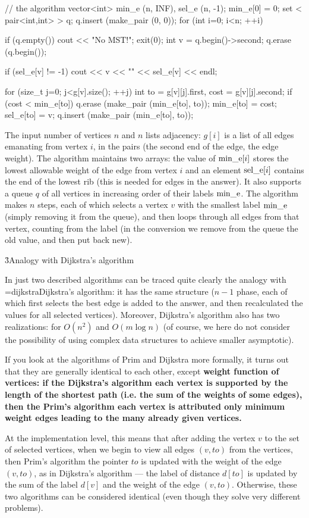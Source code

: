 // the algorithm
vector<int> min_e (n, INF), sel_e (n, -1);
min_e[0] = 0;
set < pair<int,int> > q;
q.insert (make_pair (0, 0));
for (int i=0; i<n; ++i) {
if (q.empty()) {
cout << "No MST!";
exit(0);
}
int v = q.begin()->second;
q.erase (q.begin());

if (sel_e[v] != -1)
cout << v << "" << sel_e[v] << endl;

for (size_t j=0; j<g[v].size(); ++j) {
int to = g[v][j].first,
cost = g[v][j].second;
if (cost < min_e[to]) {
q.erase (make_pair (min_e[to], to));
min_e[to] = cost;
sel_e[to] = v;
q.insert (make_pair (min_e[to], to));
}
}
}
\endcode

The input number of vertices $n$ and $n$ lists adjacency: $g[i]$ is a list of all edges emanating from vertex $i$, in the pairs (the second end of the edge, the edge weight). The algorithm maintains two arrays: the value of ${\rm min\_e}[i]$ stores the lowest allowable weight of the edge from vertex $i$ and an element ${\rm sel\_e}[i]$ contains the end of the lowest rib (this is needed for edges in the answer). It also supports a queue $q$ of all vertices in increasing order of their labels ${\rm min\_e}$. The algorithm makes $n$ steps, each of which selects a vertex $v$ with the smallest label ${\rm min\_e}$ (simply removing it from the queue), and then loops through all edges from that vertex, counting from the label (in the conversion we remove from the queue the old value, and then put back new).


\h3{Analogy with Dijkstra's algorithm}

In just two described algorithms can be traced quite clearly the analogy with \algohref=dijkstra{Dijkstra's algorithm}: it has the same structure ($n-1$ phase, each of which first selects the best edge is added to the answer, and then recalculated the values for all selected vertices). Moreover, Dijkstra's algorithm also has two realizations: for $O(n^2)$ and $O(m \log n)$ (of course, we here do not consider the possibility of using complex data structures to achieve smaller asymptotic).

If you look at the algorithms of Prim and Dijkstra more formally, it turns out that they are generally identical to each other, except \bf{weight function} of vertices: if the Dijkstra's algorithm each vertex is supported by the length of the shortest path (i.e. the sum of the weights of some edges), then the Prim's algorithm each vertex is attributed only minimum weight edges leading to the many already given vertices.

At the implementation level, this means that after adding the vertex $v$ to the set of selected vertices, when we begin to view all edges $(v,to)$ from the vertices, then Prim's algorithm the pointer $to$ is updated with the weight of the edge $(v,to)$, as in Dijkstra's algorithm --- the label of distance $d[to]$ is updated by the sum of the label $d[v]$ and the weight of the edge $(v,to)$. Otherwise, these two algorithms can be considered identical (even though they solve very different problems).


